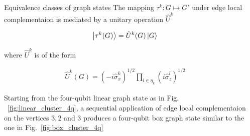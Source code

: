\documentclass[final]{beamer}
\newlength{\sepwidth}
\newlength{\colwidth}
\newcommand{\separatorcolumn}{\begin{column}{\sepwidth}\end{column}}
\begin{document}
\begin{frame}[t]
\begin{columns}[t]
            \separatorcolumn

            \begin{column}{\colwidth}
                \begin{block}{Equivalence classes of graph states}
                    The mapping $\tau^k : G \mapsto G'$ under edge local complementaion is mediated
                    by a unitary operation $\hat{U}^{k}$

                    \begin{align}
                        \ket{\tau^k(G)} =\hat{U}^{k}(G) \ket{G}
                        \label{eq:edge_local_complementation_mapping}
                    \end{align}

                    where $\hat{U}^{k}$ is of the form

                    \begin{align}
                        \hat{U}^{k}(G) = (-i\hat{\sigma}_x^{k})^{1/2} \displaystyle\prod_{l
                        \in \eta_k} (i \hat{\sigma}_z^{l})^{1/2}
                        \label{eq:edge_local_complementation_unitary}
                    \end{align}


                    Starting from the four-qubit linear graph state as in Fig.
                    ~\ref{fig:linear_cluster_4q}, a sequential application of edge local
                    complementaion on the vertices $3, 2$ and $3$ produces a four-qubit box
                    graph state similar to the one in Fig.~\ref{fig:box_cluster_4q}


\end{block}
\end{column}
\end{columns}
\end{frame}
\end{document}
